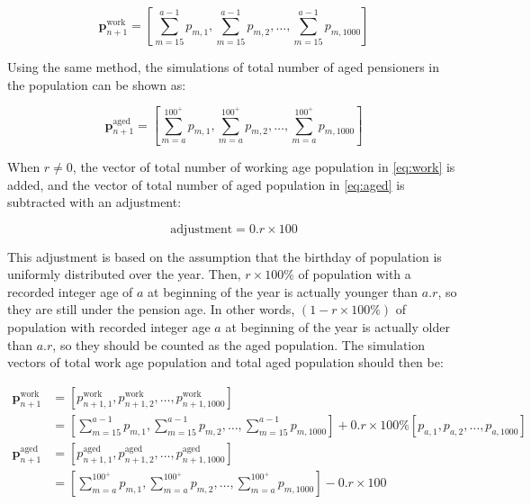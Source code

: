 \documentclass[11pt,a4paper,]{article}
\begin{document}
\begin{equation}
  \bm{p}^{\text{work}}_{n+1} = \left[\sum_{m=15}^{a-1}p_{m,1},\sum_{m=15}^{a-1}p_{m,2},\dots,\sum_{m=15}^{a-1}p_{m,1000}\right] \label{eq:work}
\end{equation}

Using the same method, the simulations of total number of aged
pensioners in the population can be shown as:

\begin{equation}
  \bm{p}^{\text{aged}}_{n+1} = \left[\sum_{m=a}^{100^+}p_{m,1},\sum_{m=a}^{100^+}p_{m,2},\dots,\sum_{m=a}^{100^+}p_{m,1000}\right]\label{eq:aged}
\end{equation}

When \(r\neq0\), the vector of total number of working age population in
\eqref{eq:work} is added, and the vector of total number of aged
population in \eqref{eq:aged} is subtracted with an adjustment:

\begin{equation}
  \text{adjustment}=0.r\times100%
\end{equation}

This adjustment is based on the assumption that the birthday of
population is uniformly distributed over the year. Then,
\(r\times100\%\) of population with a recorded integer age of \(a\) at
beginning of the year is actually younger than \(a.r\), so they are
still under the pension age. In other words, \((1-r\times100\%)\) of
population with recorded integer age \(a\) at beginning of the year is
actually older than \(a.r\), so they should be counted as the aged
population. The simulation vectors of total work age population and
total aged population should then be:

\begin{align*}
  \bm{p}^{\text{work}}_{n+1}
    & = \left[p^{\text{work}}_{n+1,1},p^{\text{work}}_{n+1,2},\dots,p^{\text{work}}_{n+1,1000}\right]\\
    & = \left[\sum_{m=15}^{a-1}p_{m,1},\sum_{m=15}^{a-1}p_{m,2},\dots,\sum_{m=15}^{a-1}p_{m,1000}\right]+0.r\times100\%\left[p_{a,1},p_{a,2},\dots,p_{a,1000}\right]   \\
  \bm{p}^{\text{aged}}_{n+1}
    & = \left[p^{\text{aged}}_{n+1,1},p^{\text{aged}}_{n+1,2},\dots,p^{\text{aged}}_{n+1,1000}\right]\\
    & = \left[\sum_{m=a}^{100^+}p_{m,1},\sum_{m=a}^{100^+}p_{m,2},\dots,\sum_{m=a}^{100^+}p_{m,1000}\right]-0.r\times100%
\end{align*}
\end{document}
